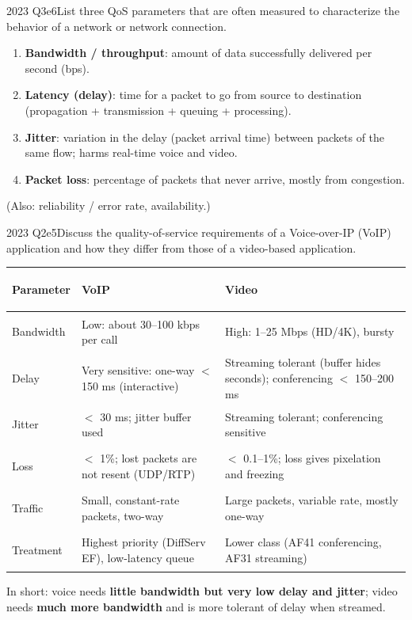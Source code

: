 \documentclass[10pt]{article}
\begin{document}
\begin{pastq}{2023 Q3e}{6}List three QoS parameters that are often measured to characterize the behavior of a network or network connection.\end{pastq}
\begin{ans}
\begin{enumerate}
\item \textbf{Bandwidth / throughput}: amount of data successfully delivered per second (bps).
\item \textbf{Latency (delay)}: time for a packet to go from source to destination (propagation + transmission + queuing + processing).
\item \textbf{Jitter}: variation in the delay (packet arrival time) between packets of the same flow; harms real-time voice and video.
\item \textbf{Packet loss}: percentage of packets that never arrive, mostly from congestion.
\end{enumerate}
(Also: reliability / error rate, availability.)
\end{ans}

\begin{pastq}{2023 Q2e}{5}Discuss the quality-of-service requirements of a Voice-over-IP (VoIP) application and how they differ from those of a video-based application.\end{pastq}
\begin{ans}
\small
\begin{tabularx}{\linewidth}{@{}>{\bfseries\raggedright\arraybackslash}p{1.9cm}XX@{}}
\toprule
Parameter & VoIP & Video\\\midrule
Bandwidth & Low: about 30--100 kbps per call & High: 1--25 Mbps (HD/4K), bursty\\
Delay & Very sensitive: one-way $<$ 150 ms (interactive) & Streaming tolerant (buffer hides seconds); conferencing $<$ 150--200 ms\\
Jitter & $<$ 30 ms; jitter buffer used & Streaming tolerant; conferencing sensitive\\
Loss & $<$ 1\%; lost packets are not resent (UDP/RTP) & $<$ 0.1--1\%; loss gives pixelation and freezing\\
Traffic & Small, constant-rate packets, two-way & Large packets, variable rate, mostly one-way\\
Treatment & Highest priority (DiffServ EF), low-latency queue & Lower class (AF41 conferencing, AF31 streaming)\\
\bottomrule
\end{tabularx}
In short: voice needs \textbf{little bandwidth but very low delay and jitter}; video needs \textbf{much more bandwidth} and is more tolerant of delay when streamed.
\end{ans}
\end{document}
